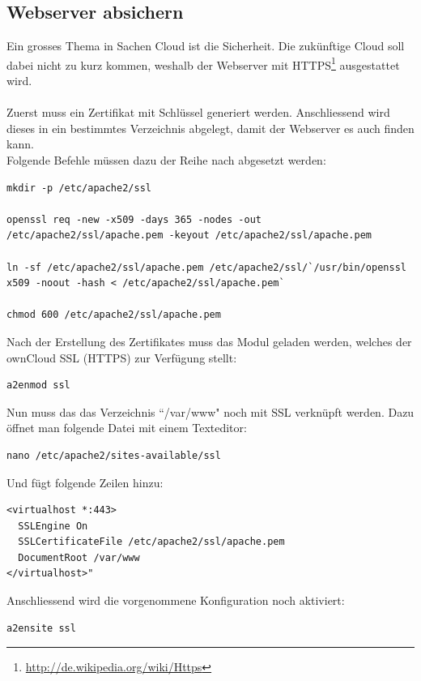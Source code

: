 \subsection{Webserver absichern}
Ein grosses Thema in Sachen Cloud ist die Sicherheit. Die zukünftige Cloud soll dabei nicht zu kurz kommen, weshalb der Webserver mit HTTPS\footnote{\url{http://de.wikipedia.org/wiki/Https}} ausgestattet wird.
\\
\\
Zuerst muss ein Zertifikat mit Schlüssel generiert werden. Anschliessend wird dieses in ein bestimmtes Verzeichnis abgelegt, damit der Webserver es auch finden kann.
\\
Folgende Befehle müssen dazu der Reihe nach abgesetzt werden:

\begin{lstlisting}
mkdir -p /etc/apache2/ssl

openssl req -new -x509 -days 365 -nodes -out /etc/apache2/ssl/apache.pem -keyout /etc/apache2/ssl/apache.pem

ln -sf /etc/apache2/ssl/apache.pem /etc/apache2/ssl/`/usr/bin/openssl x509 -noout -hash < /etc/apache2/ssl/apache.pem`

chmod 600 /etc/apache2/ssl/apache.pem
\end{lstlisting}

Nach der Erstellung des Zertifikates muss das Modul geladen werden, welches der ownCloud SSL (HTTPS) zur Verfügung stellt:

\begin{lstlisting}
a2enmod ssl
\end{lstlisting}

Nun muss das das Verzeichnis ``/var/www" noch mit SSL verknüpft werden. Dazu öffnet man folgende Datei mit einem Texteditor: 

\begin{lstlisting}
nano /etc/apache2/sites-available/ssl
\end{lstlisting}

Und fügt folgende Zeilen hinzu: 

\begin{lstlisting}
<virtualhost *:443>
  SSLEngine On
  SSLCertificateFile /etc/apache2/ssl/apache.pem
  DocumentRoot /var/www  
</virtualhost>" 
\end{lstlisting}

Anschliessend wird die vorgenommene Konfiguration noch aktiviert:

\begin{lstlisting}
a2ensite ssl
\end{lstlisting}

